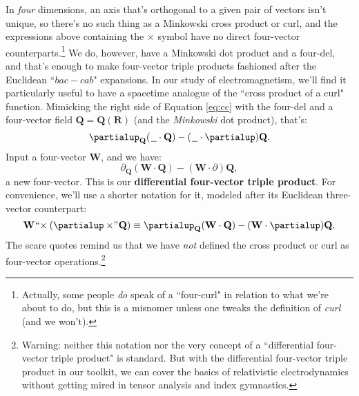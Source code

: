 \documentclass[12pt]{article}
\renewcommand{\vv}[1]{\mathbf{#1}}
\begin{document}
In \emph{four} dimensions, an axis that's orthogonal to a given pair of vectors isn't unique, so there's no such thing as a Minkowski cross product or curl, and the expressions above containing the $\times$ symbol have no direct four-vector counterparts.\footnote{Actually, some people \emph{do} speak of a ``four-curl" in relation to what we're about to do, but this is a misnomer unless one tweaks the definition of \emph{curl} (and we won't).} We do, however, have a Minkowski dot product and a four-del, and that's enough to make four-vector triple products fashioned after the Euclidean ``$bac - cab$" expansions. In our study of electromagnetism, we'll find it particularly useful to have a spacetime analogue of the ``cross product of a curl" function. Mimicking the right side of Equation \ref{eq:cc} with the four-del and a four-vector field $\vv Q = \vv Q (\vv R)$ (and the \emph{Minkowski} dot product), that's:
\begin{equation*}
\partialup_{\vv Q} ( \mkern1.5mu \text{\underline{\hspace{.6em}}} \cdot \vv Q) - ( \mkern1.5mu \text{\underline{\hspace{.6em}}} \cdot \partialup) \vv Q .
\end{equation*}
Input a four-vector $\vv W$, and we have:
\begin{equation*}
\partialup_{\vv Q} ( \vv W \cdot \vv Q) - ( \vv W \cdot \partialup) \vv Q ,
\end{equation*}
a new four-vector. This is our \textbf{differential four-vector triple product}. For convenience, we'll use a shorter notation for it, modeled after its Euclidean three-vector counterpart:
\begin{equation}\label{eq:dtp}
\vv W \mkern1mu `` \mkern-4mu \times (\partialup \times \mkern-4mu " \mkern1mu \vv Q) \equiv \partialup_{\vv Q} ( \vv W \cdot \vv Q) - ( \vv W \cdot \partialup) \vv Q .
\end{equation}
The scare quotes remind us that we have \emph{not} defined the cross product or curl as four-vector operations.\footnote{Warning: neither this notation nor the very concept of a ``differential four-vector triple product" is standard. But with the differential four-vector triple product in our toolkit, we can cover the basics of relativistic electrodynamics without getting mired in tensor analysis and index gymnastics.}
 
\end{document}
